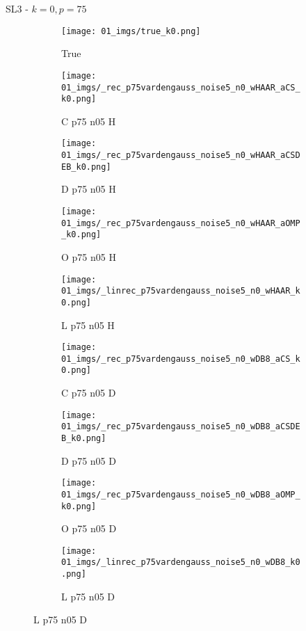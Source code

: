 \begin{frame}{SL3 - $k=0,p=75$}{}
\begin{figure}
\begin{subfigure}{0.1\textwidth}
\texttt{[image: 01\_imgs/true\_k0.png]}
\caption*{\Tiny True}
\end{subfigure}
\begin{subfigure}{0.1\textwidth}
\texttt{[image: 01\_imgs/\_rec\_p75vardengauss\_noise5\_n0\_wHAAR\_aCS\_k0.png]}
\caption*{\Tiny C p75 n05 H}
\end{subfigure}
\begin{subfigure}{0.1\textwidth}
\texttt{[image: 01\_imgs/\_rec\_p75vardengauss\_noise5\_n0\_wHAAR\_aCSDEB\_k0.png]}
\caption*{\Tiny D p75 n05 H}
\end{subfigure}
\begin{subfigure}{0.1\textwidth}
\texttt{[image: 01\_imgs/\_rec\_p75vardengauss\_noise5\_n0\_wHAAR\_aOMP\_k0.png]}
\caption*{\Tiny O p75 n05 H}
\end{subfigure}
\begin{subfigure}{0.1\textwidth}
\texttt{[image: 01\_imgs/\_linrec\_p75vardengauss\_noise5\_n0\_wHAAR\_k0.png]}
\caption*{\Tiny L p75 n05 H}
\end{subfigure}
\begin{subfigure}{0.1\textwidth}
\texttt{[image: 01\_imgs/\_rec\_p75vardengauss\_noise5\_n0\_wDB8\_aCS\_k0.png]}
\caption*{\Tiny C p75 n05 D}
\end{subfigure}
\begin{subfigure}{0.1\textwidth}
\texttt{[image: 01\_imgs/\_rec\_p75vardengauss\_noise5\_n0\_wDB8\_aCSDEB\_k0.png]}
\caption*{\Tiny D p75 n05 D}
\end{subfigure}
\begin{subfigure}{0.1\textwidth}
\texttt{[image: 01\_imgs/\_rec\_p75vardengauss\_noise5\_n0\_wDB8\_aOMP\_k0.png]}
\caption*{\Tiny O p75 n05 D}
\end{subfigure}
\begin{subfigure}{0.1\textwidth}
\texttt{[image: 01\_imgs/\_linrec\_p75vardengauss\_noise5\_n0\_wDB8\_k0.png]}
\caption*{\Tiny L p75 n05 D}
\end{subfigure}

\vspace{5pt}


\end{figure}
\end{frame}
